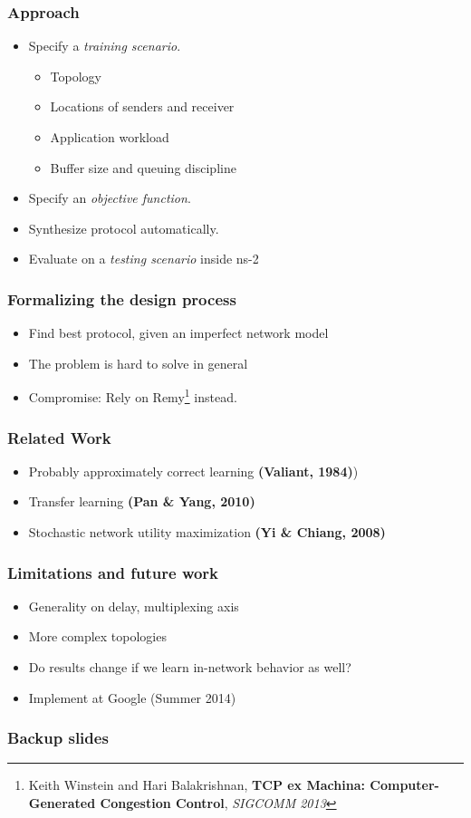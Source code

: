 \documentclass[svgnames]{beamer}
\begin{document}
\begin{Large}
\begin{frame}
\frametitle{Approach}
\begin{itemize}
\item Specify a \textit{training scenario}.
\begin{itemize}
\item Topology
\item Locations of senders and receiver
\item Application workload
\item Buffer size and queuing discipline 
\end{itemize}
\item Specify an \textit{objective function}.
\item Synthesize protocol automatically.
\item Evaluate on a \textit{testing scenario} inside ns-2
\end{itemize}
\end{frame}

\begin{frame}
\frametitle{Formalizing the design process}
\begin{itemize}
\item Find best protocol, given an imperfect network model
\item The problem is hard to solve in general
\item<2-> Compromise: Rely on Remy\footnote<2->{Keith Winstein and Hari Balakrishnan, \textbf{TCP ex Machina: Computer-Generated Congestion Control}, \textit{SIGCOMM 2013}} instead.
\end{itemize}
\end{frame}












\begin{frame}
\frametitle{Related Work}
\begin{itemize}
\item Probably approximately correct learning \textbf{(Valiant, 1984)})
\item Transfer learning \textbf{(Pan \& Yang, 2010)}
\item Stochastic network utility maximization \textbf{(Yi \& Chiang, 2008)}
\end{itemize}
\end{frame}

\begin{frame}
\frametitle{Limitations and future work}
\begin{itemize}
\item Generality on delay, multiplexing axis
\item More complex topologies
\item Do results change if we learn in-network behavior as well?
\item Implement at Google (Summer 2014)
\end{itemize}
\end{frame}
\end{Large}

\begin{frame}
\frametitle{Backup slides}
\end{frame}

\end{document}
